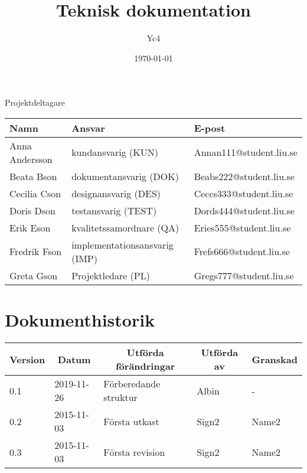 \documentclass[10pt,oneside,swedish]{lips-no_customer}
\title{Teknisk dokumentation}
\author{Yc4}
\date{\today}
\begin{document}
\maketitle

\cleardoublepage
\makeprojectid

\begin{center}
  \Large Projektdeltagare
\end{center}
\begin{center}
  \begin{tabular}{|l|l|l|}
    \hline
    \textbf{Namn} & \textbf{Ansvar} & \textbf{E-post}\\
    \hline
    Anna Andersson & kundansvarig (KUN) & Annan111@student.liu.se\\
    \hline
    Beata Bson & dokumentansvarig (DOK) & Beabs222@student.liu.se\\
    \hline
    Cecilia Cson & designansvarig (DES) & Ceccs333@student.liu.se\\
    \hline
    Doris Dson & testansvarig (TEST) & Dords444@student.liu.se\\
    \hline
    Erik Eson & kvalitetssamordnare (QA) & Eries555@student.liu.se\\
    \hline
    Fredrik Fson & implementationsansvarig (IMP) & Frefs666@student.liu.se\\
    \hline
    Greta Gson & Projektledare (PL) & Gregs777@student.liu.se\\
    \hline
  \end{tabular}
\end{center}

\section*{Dokumenthistorik}
\begin{tabular}{p{}|p{}|p{}|p{}|p{}} 
  \multicolumn{1}{c}{\bfseries Version} & 
  \multicolumn{1}{|c}{\bfseries Datum} & 
  \multicolumn{1}{|c}{\bfseries Utförda förändringar} & 
  \multicolumn{1}{|c}{\bfseries Utförda av} & 
  \multicolumn{1}{|c}{\bfseries Granskad}\\
  \hline
  \hline
  0.1 & 2019-11-26 & Förberedande struktur & Albin &   - \\
  \hline
  0.2 & 2015-11-03 & Första utkast & Sign2 & Name2   \\
  \hline
  0.3 & 2015-11-03 & Första revision & Sign2 & Name2   \\
  \hline

\end{tabular}
\end{document}
